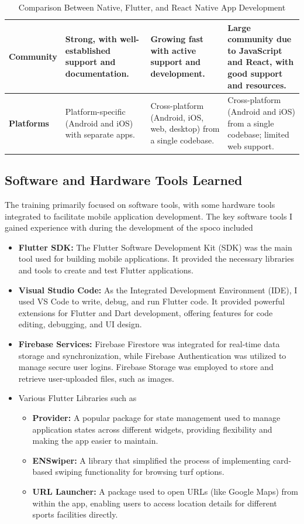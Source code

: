 \documentclass[12pt,a4paper]{report}
\begin{document}
\begin{table}
\begin{tabular}{|p{3cm}|p{4cm}|p{4cm}|p{4cm}|}
\textbf{Community} & Strong, with well-established support and documentation. & Growing fast with active support and development. & Large community due to JavaScript and React, with good support and resources. \\ \hline
\textbf{Platforms} & Platform-specific (Android and iOS) with separate apps. & Cross-platform (Android, iOS, web, desktop) from a single codebase. & Cross-platform (Android and iOS) from a single codebase; limited web support. \\ \hline
\end{tabular}
\caption{Comparison Between Native, Flutter, and React Native App Development}
\end{table}



\subsection{Software and Hardware Tools Learned}
The training primarily focused on software tools, with some hardware tools integrated to facilitate mobile application development. The key software tools I gained experience with during the development of the spoco included

\begin{itemize}
    \item \textbf{Flutter SDK:} The Flutter Software Development Kit (SDK) was the main tool used for building mobile applications. It provided the necessary libraries and tools to create and test Flutter applications.
    \item \textbf{Visual Studio Code:} As the Integrated Development Environment (IDE), I used VS Code to write, debug, and run Flutter code. It provided powerful extensions for Flutter and Dart development, offering features for code editing, debugging, and UI design.
    \item \textbf{ Firebase Services:}  Firebase Firestore was integrated for real-time data storage and synchronization, while Firebase Authentication was utilized to manage secure user logins. Firebase Storage was employed to store and retrieve user-uploaded files, such as images.
    \item Various Flutter Libraries such as 
    \begin{itemize}
        \item \textbf{Provider:} A popular package for state management used to manage application states across different widgets, providing flexibility and making the app easier to maintain.
        \item \textbf{ ENSwiper:} A library that simplified the process of implementing card-based swiping functionality for browsing turf options.
        \item \textbf{URL Launcher:} A package used to open URLs (like Google Maps) from within the app, enabling users to access location details for different sports facilities directly.

    \end{itemize}
\end{itemize}
\end{document}
